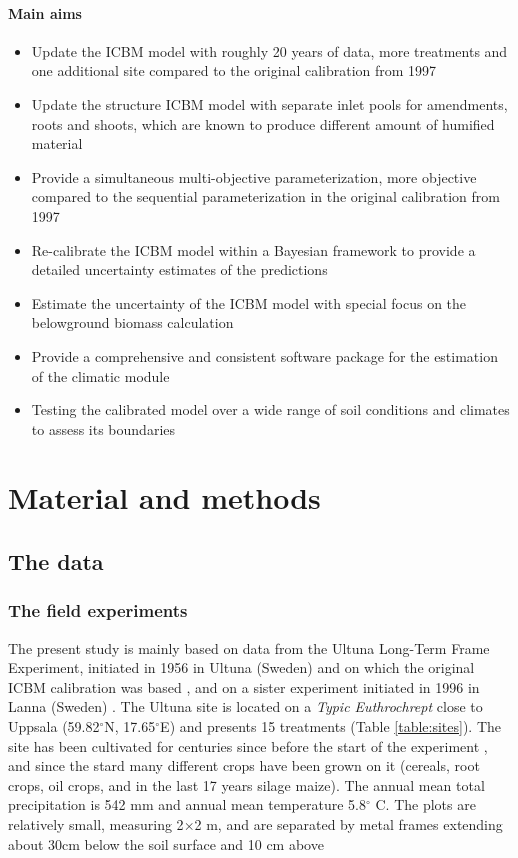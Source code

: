 \documentclass[review]{elsarticle}
\begin{document}
\paragraph{Main aims} 
\begin{itemize}
\item Update the ICBM model with roughly 20 years of data, more treatments and one additional site compared to the original calibration from 1997 \cite{Andren1997}
\item Update the structure ICBM model with separate inlet pools for amendments, roots and shoots, which are known to produce different amount of humified material \cite{Katterer2011}
\item Provide a simultaneous multi-objective parameterization, more objective compared to the sequential parameterization in the original calibration from 1997 \cite{Andren1997}
\item Re-calibrate the ICBM model within a Bayesian framework to provide a detailed uncertainty estimates of the predictions
\item Estimate the uncertainty of the ICBM model with special focus on the belowground biomass calculation
\item Provide a comprehensive and consistent software package for the estimation of the climatic module
\item Testing the calibrated model over a wide range of soil conditions and climates to assess its boundaries
\end{itemize}
\section{Material and methods}

\subsection{The data}

\subsubsection{The field experiments}
The present study is mainly based on data from the Ultuna Long-Term Frame Experiment, initiated in 1956 in Ultuna (Sweden) and on which the original ICBM calibration was based \cite{Andren1997}, and on a sister experiment initiated in 1996 in Lanna (Sweden) \cite{Katterer2014}.
The Ultuna site is located on a \textit{Typic Euthrochrept} close to Uppsala (59.82$^{\circ}$N, 17.65$^{\circ}$E) and presents 15 treatments (Table  \ref{table:sites}). The site has been cultivated for centuries since before the start of the experiment \cite{Katterer2011}, and since the stard many different crops have been grown on it (cereals, root crops, oil crops, and in the last 17 years silage maize). The annual mean total precipitation is 542 mm and annual mean temperature 5.8$^{\circ}$ C. The plots are relatively small, measuring 2$\times$2 m, and are separated by metal frames extending about 30cm below the soil surface and 10 cm above\\
\end{document}

